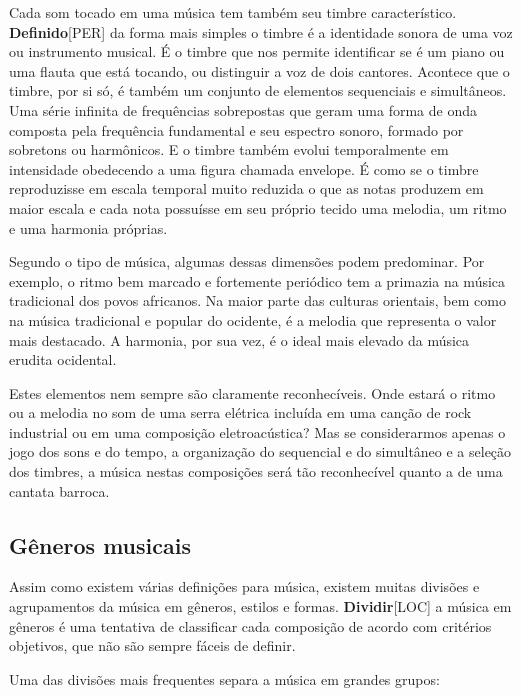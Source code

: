 \documentclass[a4paper,12pt]{article}
\begin{document}
Cada som tocado em uma música tem também seu timbre característico. \textbf{Definido}\textsc{[PER]} da forma mais simples o timbre é a identidade sonora de uma voz ou instrumento musical. É o timbre que nos permite identificar se é um piano ou uma flauta que está tocando, ou distinguir a voz de dois cantores. Acontece que o timbre, por si só, é também um conjunto de elementos sequenciais e simultâneos. Uma série infinita de frequências sobrepostas que geram uma forma de onda composta pela frequência fundamental e seu espectro sonoro, formado por sobretons ou harmônicos. E o timbre também evolui temporalmente em intensidade obedecendo a uma figura chamada envelope. É como se o timbre reproduzisse em escala temporal muito reduzida o que as notas produzem em maior escala e cada nota possuísse em seu próprio tecido uma melodia, um ritmo e uma harmonia próprias.

Segundo o tipo de música, algumas dessas dimensões podem predominar. Por exemplo, o ritmo bem marcado e fortemente periódico tem a primazia na música tradicional dos povos africanos. Na maior parte das culturas orientais, bem como na música tradicional e popular do ocidente, é a melodia que representa o valor mais destacado. A harmonia, por sua vez, é o ideal mais elevado da música erudita ocidental.

Estes elementos nem sempre são claramente reconhecíveis. Onde estará o ritmo ou a melodia no som de uma serra elétrica incluída em uma canção de rock industrial ou em uma composição eletroacústica? Mas se considerarmos apenas o jogo dos sons e do tempo, a organização do sequencial e do simultâneo e a seleção dos timbres, a música nestas composições será tão reconhecível quanto a de uma cantata barroca.

\subsection*{Gêneros musicais}
Assim como existem várias definições para música, existem muitas divisões e agrupamentos da música em gêneros, estilos e formas. \textbf{Dividir}\textsc{[LOC]} a música em gêneros é uma tentativa de classificar cada composição de acordo com critérios objetivos, que não são sempre fáceis de definir.

Uma das divisões mais frequentes separa a música em grandes grupos:
\end{document}
